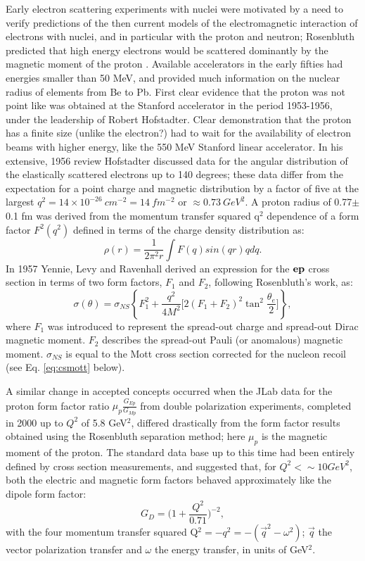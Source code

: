 Early  electron scattering experiments with nuclei were motivated by a need to verify predictions of the then current models
 of the electromagnetic interaction of electrons with nuclei, and in particular with the proton and neutron; Rosenbluth
 predicted that high energy electrons would be scattered dominantly by the magnetic moment of the proton \cite{rosenbluth}. 
Available accelerators in the early fifties had energies smaller than 50 MeV, and provided much information on the nuclear
radius of elements from Be to Pb. First clear evidence that the proton was not point like was obtained at the Stanford
accelerator in the period 1953-1956, under the leadership of Robert Hofstadter. Clear demonstration that the proton has
 a finite size (unlike the electron?) had to wait for the availability of electron beams with higher energy, like
 the 550 MeV Stanford linear accelerator. In his extensive, 1956 review Hofstadter \cite{hofstadter56} discussed data
for the angular distribution of the elastically scattered electrons up to 140 degrees; these data differ from the
expectation for a point charge and magnetic distribution by a factor of five at the largest 
$ q^2= 14\times 10^{-26}\ cm^{-2}= 14 \ fm^{-2}$ or $\approx 0.73 \ GeV^2$. A proton radius of 0.77$\pm$0.1 fm was derived from
the momentum transfer squared q$^2$ dependence of a form factor $F^2(q^2)$ defined in terms of the charge density
distribution as:
\begin{equation}
\rho(r)=\frac{1}{2\pi^2r}\int F(q)sin(qr)qdq. 
\end{equation}
\noindent
In 1957 Yennie, Levy and Ravenhall \cite{yennie57} derived an expression for the ${\bf ep}$ cross section in terms of two form factors, 
$F_1$ and $F_2$, following Rosenbluth's work, as:
\begin{equation}
\sigma(\theta)=\sigma_{NS}\left\{F_1^2+\frac{q^2}{4M^2}\Big[2(F_1+F_2)^2\tan^2\frac{\theta_e}{2}\Big]\right\},
\end{equation}
\noindent
where $F_1$ was introduced to represent the spread-out charge and spread-out Dirac magnetic moment. $F_2$ describes the spread-out
Pauli (or anomalous) magnetic moment. $\sigma_{NS}$ is equal to the Mott cross section corrected for the nucleon recoil (see Eq. \ref{eq:csmott}
below). 

A similar change in accepted concepts occurred when the JLab data for the proton form factor ratio $\mu_p\frac{G_{Ep}}{G_{Mp}}$ from
double polarization experiments, completed in 2000 up to $Q^2$ of 
 5.8 GeV$^2$, differed drastically from the form factor results obtained using the Rosenbluth separation method; here $\mu_p$ is the magnetic
 moment of the proton. 
The standard data base up to this time had been entirely defined by cross section measurements, and
 suggested that, for $Q^2 < \sim 10 GeV^2$, both the electric and magnetic form factors behaved approximately like the dipole form factor:
\begin{equation}
 G_D=\Big(1+\frac{Q^2}{0.71}\Big)^{-2}, 
\label{eq:dipole}
\end{equation} 
with the four momentum transfer squared Q$^2=-q^2=-(\vec q^2-\omega^2)$; $\vec q$ the vector polarization transfer and $\omega$
 the energy transfer, in units of GeV$^2$.

